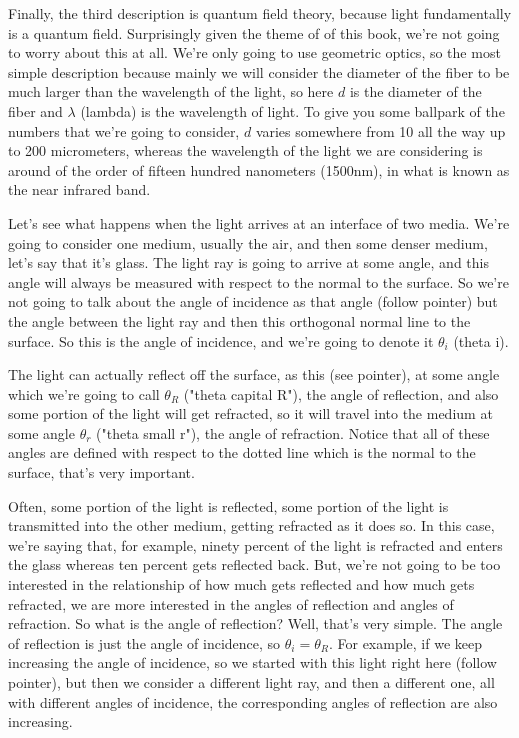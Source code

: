 Finally, the third description is quantum field theory, because light fundamentally is a quantum field. Surprisingly given the theme of of this book, we're not going to worry about this at all. We're only going to use geometric optics, so the most simple description because mainly we will consider the diameter of the fiber to be much larger than the wavelength of the light, so here $d$ is the diameter of the fiber and $\lambda$ (lambda) is the wavelength of light. To give you some ballpark of the numbers that we're going to consider, $d$ varies somewhere from 10 all the way up to 200 micrometers, whereas the wavelength of the light we are considering is around of the order of fifteen hundred nanometers (1500nm), in what is known as the near infrared band.

Let's see what happens when the light arrives at an interface of two media. We're going to consider one medium, usually the air, and then some denser medium, let's say that it's glass. The light ray is going to arrive at some angle, and this angle will always be measured with respect to the normal to the surface. So we're not going to talk about the angle of incidence as that angle (follow pointer) but the angle between the light ray and then this orthogonal normal line to the surface. So this is the angle of incidence, and we're going to denote it $\theta_i$ (theta i).

The light can actually reflect off the surface, as this (see pointer), at some angle which we're going to call $\theta_R$ ("theta capital R"), the angle of reflection, and also some portion of the light will get refracted, so it will travel into the medium at some angle $\theta_r$ ("theta small r"), the angle of refraction. Notice that all of these angles are defined with respect to the dotted line which is the normal to the surface, that's very important.

Often, some portion of the light is reflected, some portion of the light is transmitted into the other medium, getting refracted as it does so. In this case, we're saying that, for example, ninety percent of the light is refracted and enters the glass whereas ten percent gets reflected back. But, we're not going to be too interested in the relationship of how much gets reflected and how much gets refracted, we are more interested in the angles of reflection and angles of refraction. So what is the angle of reflection? Well, that's very simple. The angle of reflection is just the angle of incidence, so $\theta_i = \theta_R$. For example, if we keep increasing the angle of incidence, so we started with this light right here (follow pointer), but then we consider a different light ray, and then a different one, all with different angles of incidence, the corresponding angles of reflection are also increasing.

